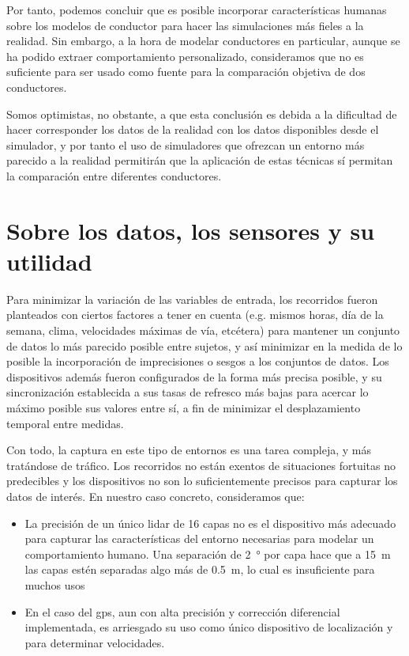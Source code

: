 Por tanto, podemos concluir que es posible incorporar características humanas sobre los modelos de conductor para hacer las simulaciones más fieles a la realidad. Sin embargo, a la hora de modelar conductores en particular, aunque se ha podido extraer comportamiento personalizado, consideramos que no es suficiente para ser usado como fuente para la comparación objetiva de dos conductores.

Somos optimistas, no obstante, a que esta conclusión es debida a la dificultad de hacer corresponder los datos de la realidad con los datos disponibles desde el simulador, y por tanto el uso de simuladores que ofrezcan un entorno más parecido a la realidad permitirán que la aplicación de estas técnicas sí permitan la comparación entre diferentes conductores.

\section{Sobre los datos, los sensores y su utilidad}

Para minimizar la variación de las variables de entrada, los recorridos fueron planteados con ciertos factores a tener en cuenta (e.g. mismos horas, día de la semana, clima, velocidades máximas de vía, etcétera) para mantener un conjunto de datos lo más parecido posible entre sujetos, y así minimizar en la medida de lo posible la incorporación de imprecisiones o sesgos a los conjuntos de datos. Los dispositivos además fueron configurados de la forma más precisa posible, y su sincronización establecida a sus tasas de refresco más bajas para acercar lo máximo posible sus valores entre sí, a fin de minimizar el desplazamiento temporal entre medidas.

Con todo, la captura en este tipo de entornos es una tarea compleja, y más tratándose de tráfico. Los recorridos no están exentos de situaciones fortuitas no predecibles y los dispositivos no son lo suficientemente precisos para capturar los datos de interés. En nuestro caso concreto, consideramos que:

\begin{itemize}
	\item La precisión de un único \acrshort{lidar} de 16 capas no es el dispositivo más adecuado para capturar las características del entorno necesarias para modelar un comportamiento humano. Una separación de \SI{2}{\degree} por capa hace que a \SI{15}{\meter} las capas estén separadas algo más de \SI{0.5}{\meter}, lo cual es insuficiente para muchos usos
	\item En el caso del \Acrshort{gps}, aun con alta precisión y corrección diferencial implementada, es arriesgado su uso como único dispositivo de localización y para determinar velocidades.
\end{itemize}

